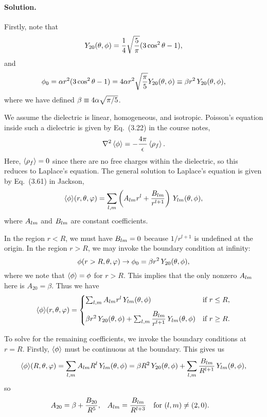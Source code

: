 \documentclass[11pt]{article}
\newcommand{\beq}{\begin{equation*}}
\newcommand{\eeq}{\end{equation*}}
\newcommand{\beqn}{\begin{equation}}
\newcommand{\eeqn}{\end{equation}}
\newenvironment{solution}
{
    \paragraph{Solution.}
    \ignorespaces
}
{
    \bigskip
}
\begin{document}
\begin{solution}
	Firstly, note that
	\beq
		\Ytotv = \frac{1}{4} \sqrt{\frac{5}{\pi}} (3 \cos^2\tht - 1),
	\eeq
	and
	\beq
		\phio = \alp r^2 (3 \cos^2\tht - 1) = 4 \alp r^2 \sqrt{\frac{\pi}{5}} \Ytotv \equiv \beta r^2 \, \Ytotv,
	\eeq
	where we have defined $\beta \equiv 4 \alpha \sqrt{\pi/5}$.

	We assume the dielectric is linear, homogeneous, and isotropic.  Poisson's equation inside such a dielectric is given by Eq.~(3.22) in the course notes,
	\beq
		\lap\evphi = -\frac{4\pi}{\eps} \evrhof.
	\eeq
	Here, $\evrhof = 0$ since there are no free charges within the dielectric, so this reduces to Laplace's equation.  The general solution to Laplace's equation is given by Eq.~(3.61) in Jackson,
	\beqn \label{lapsol}
		\evphi\!(r, \tht, \vph) = \sum_{l,m} \left( \Alm r^l + \frac{\Blm}{r^{l+1}} \right) \, \Ylm\tv,
	\eeqn
	where $A_{l m}$ and $B_{l m}$ are constant coefficients.
	
	In the region $r < R$, we must have $B_{l m} = 0$ because $1/r^{l+1}$ is undefined at the origin.  In the region $r > R$, we may invoke the boundary condition at infinity:
	\beq
		\phi(r > R, \tht, \vph) \to \phio = \beta r^2 \, \Ytotv,
	\eeq
	where we note that $\evphi = \phi$ for $r > R$.  This implies that the only nonzero $A_{l m}$ here is $A_{2 0} = \beta$.  Thus we have
	\beq
		\evphi\!(r, \tht, \vph) = \begin{cases} \sum_{l,m} \Alm r^l \, \Ylm\tv & \tif r \leq R, \\[2ex]
		\beta r^2 \, \Ytotv + \sum_{l,m} \dfrac{\Blm}{r^{l+1}} \, \Ylm\tv & \tif r \geq R. \end{cases}
	\eeq
	
	To solve for the remaining coefficients, we invoke the boundary conditions at $r = R$.  Firstly, $\evphi$ must be continuous at the boundary.  This gives us
	\beq
		\evphi\!(R, \tht, \vph) = \sum_{l,m} \Alm R^l \, \Ylm\tv = \beta R^2 \, \Ytotv + \sum_{l,m} \dfrac{\Blm}{R^{l+1}} \, \Ylm\tv,
	\eeq
	so
	\begin{align} \label{c1}
		A_{2 0} &= \beta + \dfrac{B_{2 0}}{R^{5}}, &
		A_{l m} &= \frac{B_{l m}}{R^{l+3}} \quad \text{for } (l,m) \neq (2,0).
	\end{align}
	

\end{solution}
\end{document}
